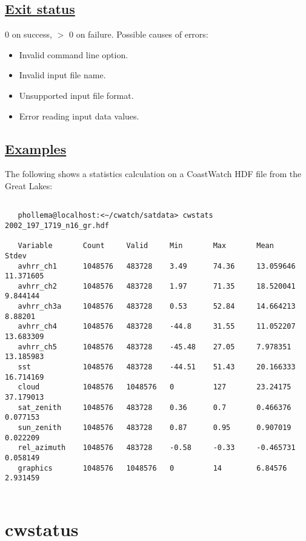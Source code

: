 \subsection*{\underline{Exit status}}


  0 on success, $>$ 0 on failure. Possible causes of errors: \begin{itemize}
\item  Invalid command line option. 
\item  Invalid input file name. 
\item  Unsupported input file format. 
\item  Error reading input data values. 

\end{itemize}

\subsection*{\underline{Examples}}


  The following shows a statistics calculation on a CoastWatch HDF file from the Great Lakes: \begin{verbatim}

   phollema@localhost:<~/cwatch/satdata> cwstats 2002_197_1719_n16_gr.hdf

   Variable       Count     Valid     Min       Max       Mean       Stdev     
   avhrr_ch1      1048576   483728    3.49      74.36     13.059646  11.371605 
   avhrr_ch2      1048576   483728    1.97      71.35     18.520041  9.844144  
   avhrr_ch3a     1048576   483728    0.53      52.84     14.664213  8.88201   
   avhrr_ch4      1048576   483728    -44.8     31.55     11.052207  13.683309 
   avhrr_ch5      1048576   483728    -45.48    27.05     7.978351   13.185983 
   sst            1048576   483728    -44.51    51.43     20.166333  16.714169 
   cloud          1048576   1048576   0         127       23.24175   37.179013 
   sat_zenith     1048576   483728    0.36      0.7       0.466376   0.077153  
   sun_zenith     1048576   483728    0.87      0.95      0.907019   0.022209  
   rel_azimuth    1048576   483728    -0.58     -0.33     -0.465731  0.058149  
   graphics       1048576   1048576   0         14        6.84576    2.931459  
 
\end{verbatim}


\newpage
\section{cwstatus} \hypertarget{cwstatus}{}
